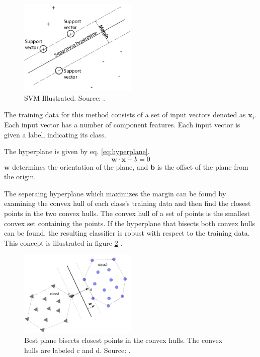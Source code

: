 \begin{figure}[ht]
\centering
\includegraphics[width = 0.5\textwidth]{img/svmhyperplane}
\caption[SVM Illustrated]{SVM Illustrated. Source: \citep{svmmathworks}.}
\label{fig::SVM-illustrated}
\end{figure}

The training data for this method consists of a set of input vectors denoted as 
$\mathbf{x_i}$.
Each input vector has a number of component features. Each input 
vector is given a label, indicating its class.

The hyperplane is given by eq. \eqref{eq:hyperplane}.
\begin{equation}
\mathbf{w} \cdot \mathbf{x} + b = 0
\label{eq:hyperplane}
\end{equation}
$\mathbf{w}$ determines the orientation of the plane, and 
$\mathbf{b}$ is the offset of the plane from the origin.
 
The seperaing hyperplane which maximizes the margin can be found by examining 
the convex hull of each class’s training data and then find the closest points 
in the two convex hulls. The convex hull of a set of points is the
smallest convex set containing the points. If the hyperplane that bisects both 
convex hulls can be found, the resulting classifier is robust with
respect to the training data.
This concept is illustrated in figure \ref{fig:convex_hull} \citep{convexhull}.
\begin{figure}[ht]
\centering
\includegraphics[width = 0.5\textwidth]{img/convex_hull.png}
\caption[Best plane bisects closest points in the convex hulls]
{Best plane bisects closest points in the convex hulls. The convex hulls 
are labeled c and d. Source: \citep{convexhull}.}
\label{fig:convex_hull}
\end{figure}  

